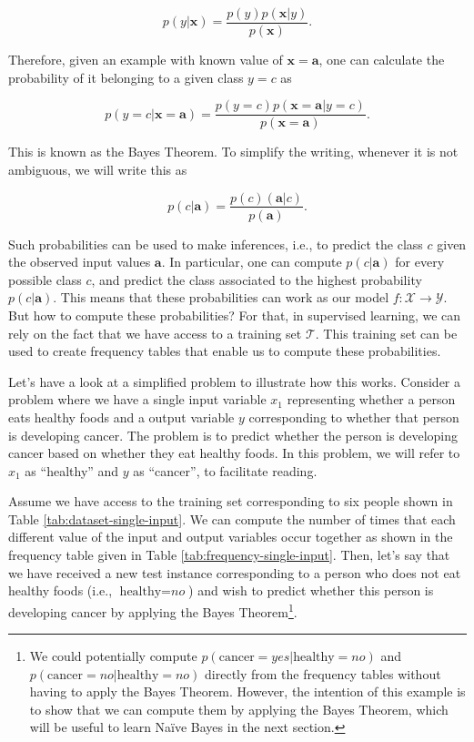 \[p(y|\mathbf{x}) = \frac{p(y) p(\mathbf{x}|y)}{p(\mathbf{x})}.\]

Therefore, given an example with known value of $\mathbf{x}=\mathbf{a}$, one can calculate the probability of it belonging to a given class $y = c$ as

\begin{equation}p(y=c|\mathbf{x}=\mathbf{a}) = \frac{p(y=c) p(\mathbf{x}=\mathbf{a}|y=c)}{p(\mathbf{x}=\mathbf{a})}. \label{eq:bayes-theorem} \end{equation}

\noindent This is known as the Bayes Theorem. To simplify the writing, whenever it is not ambiguous, we will write this as

\[p(c|\mathbf{a}) = \frac{p(c) (\mathbf{a}|c)}{p(\mathbf{a})}.\]

Such probabilities can be used to make inferences, i.e., to predict the class $c$ given the observed input values $\mathbf{a}$. In particular, one can compute $p(c|\mathbf{a})$ for every possible class $c$, and predict the class associated to the highest probability $p(c|\mathbf{a})$. This means that these probabilities can work as our model $f: \mathcal{X} \rightarrow \mathcal{Y}$. 
But how to compute these probabilities?
For that, in supervised learning, we can rely on the fact that we have access to a training set $\mathcal{T}$. This training set can be used to create frequency tables that enable us to compute these probabilities. 

Let's have a look at a simplified problem to illustrate how this works. Consider a problem where we have a single input variable $x_1$ representing whether a person eats healthy foods and a output variable $y$ corresponding to whether that person is developing cancer. The problem is to predict whether the person is developing cancer based on whether they eat healthy foods. In this problem, we will refer to $x_1$ as ``healthy'' and $y$ as ``cancer'', to facilitate reading. 

Assume we have access to the training set corresponding to six people shown in Table \ref{tab:dataset-single-input}. We can compute the number of times that each different value of the input and output variables occur together as shown in the frequency table given in Table \ref{tab:frequency-single-input}. Then, let's say that we have received a new test instance corresponding to a person who does not eat healthy foods (i.e., $\text{healthy} = \textit{no}$) and wish to predict whether this person is developing cancer by applying the Bayes Theorem\footnote{We could potentially compute $p(\text{cancer}=\textit{yes}|\text{healthy} = \textit{no})$ and $p(\text{cancer}=\textit{no}|\text{healthy} = \textit{no})$ directly from the frequency tables without having to apply the Bayes Theorem. However, the intention of this example is to show that we can compute them by applying the Bayes Theorem, which will be useful to learn Na\"{i}ve Bayes in the next section.}. 

